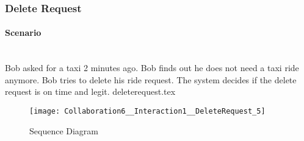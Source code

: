 \subsubsection{Delete Request} 
\label{ssub:deleterequest_scenario}
\paragraph{Scenario} \hfill \\
Bob asked for a taxi 2 minutes ago. Bob finds out he does not need a taxi ride anymore. Bob tries to delete his ride request. The system decides if the delete request is on time and legit.
{deleterequest.tex}
\newpage
\vfill
\begin{figure}
\caption{Sequence Diagram}
\texttt{[image: Collaboration6\_\_Interaction1\_\_DeleteRequest\_5]}
\centering
\end{figure}
\vfill
\clearpage
